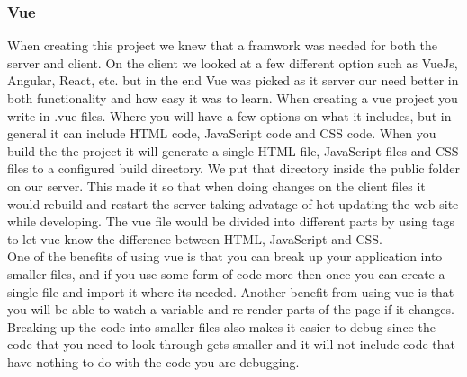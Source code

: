 \subsubsection{Vue}
When creating this project we knew that a framwork was needed for both the server and client. On the client we looked at a few different option such as VueJs, Angular, React, etc. but in the end Vue was picked as it server our need better in both functionality and how easy it was to learn. When creating a vue project you write in .vue files. Where you will have a few options on what it includes, but in general it can include HTML code, JavaScript code and CSS code. When you build the the project it will generate a single HTML file, JavaScript files and CSS files to a configured build directory. We put that directory inside the public folder on our server. This made it so that when doing changes on the client files it would rebuild and restart the server taking advatage of hot updating the web site while developing. The vue file would be divided into different parts by using tags to let vue know the difference between HTML, JavaScript and CSS.
\\[11pt]
One of the benefits of using vue is that you can break up your application into smaller files, and if you use some form of code more then once you can create a single file and import it where its needed. Another benefit from using vue is that you will be able to watch a variable and re-render parts of the page if it changes. Breaking up the code into smaller files also makes it easier to debug since the code that you need to look through gets smaller and it will not include code that have nothing to do with the code you are debugging.
\\[11pt]
